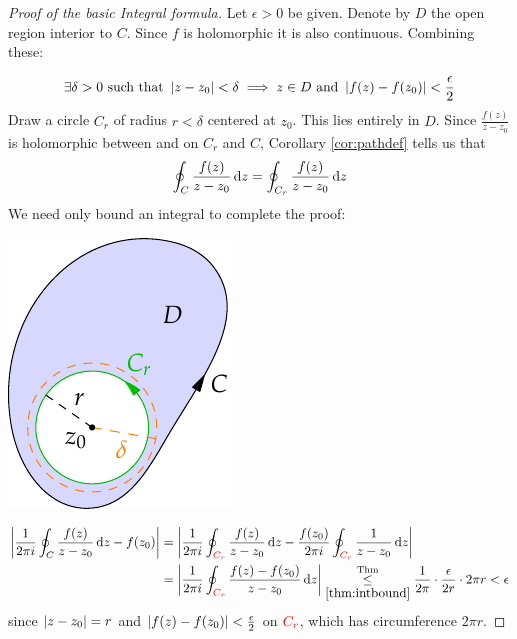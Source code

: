 \begin{proof}[Proof of the basic Integral formula\footnotemark]
	Let $\epsilon>0$ be given. Denote by $D$ the open region interior to $C$. Since $f$ is holomorphic it is also continuous. Combining these:\par
	\begin{minipage}[t]{0.75\linewidth}\vspace{-15pt}
		\[
			\exists\delta>0\ \text{such that}\ \left| z-z_0\right|<\delta\implies z\in D\ \text{and}\ \left| f(z)-f(z_0)\right|<\frac\epsilon 2
		\]
		Draw a circle $C_r$ of radius $r<\delta$ centered at $z_0$. This lies entirely in $D$. Since $\frac{f(z)}{z-z_0}$ is holomorphic between and on $C_r$ and $C$, Corollary \ref{cor:pathdef} tells us that
		\[
			\oint_C\frac{f(z)}{z-z_0}\,{\mathrm{d} z}=\oint_{C_r}\frac{f(z)}{z-z_0}\,{\mathrm{d} z}
		\]
		We need only bound an integral to complete the proof:
	\end{minipage}
	\hfill
	\begin{minipage}[t]{0.24\linewidth}\vspace{-10pt}
		\flushright\includegraphics{cauchyintegral}
	\end{minipage}
	\begin{align*}
		\nm{\frac 1{2\pi i}\oint_{C}\frac{f(z)}{z-z_0}\,\dz-f(z_0)}
		&=\nm{\frac 1{2\pi i}\oint_{\textcolor{red}{C_r}}\frac{f(z)}{z-z_0}\,\dz-\frac{f(z_0)}{2\pi i}\oint_{\textcolor{red}{C_r}}\frac{1}{z-z_0}\,\dz}\\
		&=\nm{\frac 1{2\pi i}\oint_{\textcolor{red}{C_r}}\frac{f(z)-f(z_0)}{z-z_0}\,\dz}
		\underset{\ref{thm:intbound}}{\overset{\text{Thm}}{\le}} \frac 1{2\pi}\cdot\frac{\epsilon}{2r}\cdot 2\pi r
		<\epsilon %
	\end{align*}
	since $\left| z-z_0\right|=r$ and $\left| f(z)-f(z_0)\right|<\frac\epsilon 2$ on $\textcolor{red}{C_r}$, which has circumference $2\pi r$.
\end{proof}

